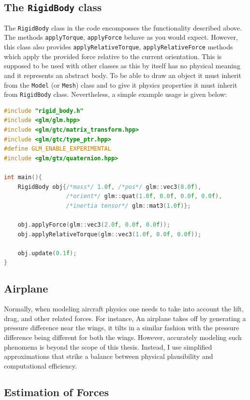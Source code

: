 \subsection{The \texttt{RigidBody} class}
The \texttt{RigidBody} class in the code encomposses the functionality described above. The methods \texttt{applyTorque}, \texttt{applyForce} behave as you would expect. However, this class also provides \texttt{applyRelativeTorque}, \texttt{applyRelativeForce} methods which apply the provided force relative to the current orientation.
This is supposed to be used with other classes as this by itself has no physical meaning and it represents an abstract body. To be able to draw an object it must inherit from the \texttt{Model} (or \texttt{Mesh}) class and to give it physics properties it must inherit from \texttt{RigidBody} class. Nevertheless, a simple example usage is given below:
\begin{lstlisting}[language=C++]
#include "rigid_body.h"
#include <glm/glm.hpp>
#include <glm/gtc/matrix_transform.hpp>
#include <glm/gtc/type_ptr.hpp>
#define GLM_ENABLE_EXPERIMENTAL
#include <glm/gtx/quaternion.hpp>

int main(){
    RigidBody obj{/*mass*/ 1.0f, /*pos*/ glm::vec3(0.0f), 
                  /*orient*/ glm::quat(1.0f, 0.0f, 0.0f, 0.0f), 
                  /*inertia tensor*/ glm::mat3(1.0f)};

    obj.applyForce(glm::vec3(2.0f, 0.0f, 0.0f));
    obj.applyRelativeTorque(glm::vec3(1.0f, 0.0f, 0.0f));

    obj.update(0.1f);
}
\end{lstlisting}

\subsection{Airplane}
Normally, when modeling aircraft physics one needs to take into account the lift, drag, and other related forces. For instance, An airplane takes off by generating a pressure difference near the wings, it tilts in a similar fashion with the pressure difference being different for both the wings. However, accurately modeling such phenomena is beyond the scope of this thesis. Instead, I use simplified approximations that strike a balance between physical plausibility and computational efficiency.

\subsection{Estimation of Forces}

